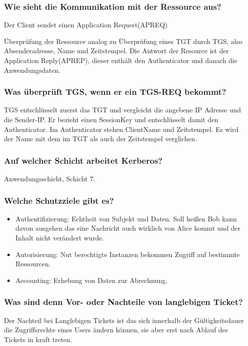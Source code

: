 	
	\subsubsection{Wie sieht die Kommunikation mit der Ressource aus?}
	Der Client sendet einen Application Request(AP\textunderscore REQ) 
	
		 Überprüfung der Ressource analog zu Überprüfung eines TGT durch TGS, also Absenderadresse, Name und Zeitstempel. Die Antwort der Resource ist der Application Reply(AP\textunderscore REP), dieser enthält den Authenticator und danach die Anwendungsdaten.
	
	
	\subsubsection{Was überprüft TGS, wenn er ein TGS-REQ bekommt?}
	TGS entschlüsselt zuerst das TGT und vergleicht die angebene IP Adresse und die Sender-IP. Er bezieht einen SessionKey und entschlüsselt damit den Authenticator. Im Authenticator stehen ClientName und Zeitstempel. Es wird der Name mit dem im TGT als auch der Zeitstempel verglichen. 
	\subsubsection{Auf welcher Schicht arbeitet Kerberos?}
	Anwendungsschicht, Schicht 7.
	\subsubsection{Welche Schutzziele gibt es?}
		\begin{itemize}
			\item Authentifizierung: Echtheit von Subjekt und Daten. Soll heißen Bob kann davon ausgehen das eine Nachricht auch wirklich von Alice kommt und der Inhalt nicht verändert wurde.
			\item Autorisierung: Nut berechtigte Instanzen bekommen Zugriff auf bestimmte Ressourcen.
			\item Accounting: Erhebung von Daten zur Abrechnung.
		\end{itemize}
	
	\subsubsection{Was sind denn Vor- oder Nachteile von langlebigen Ticket?}
	Der Nachteil bei Langlebigen Tickets ist das sich innerhalb der Gültigkeitsdauer die Zugriffsrechte eines Users ändern können, sie aber erst nach Ablauf des Tickets in kraft treten.
	
